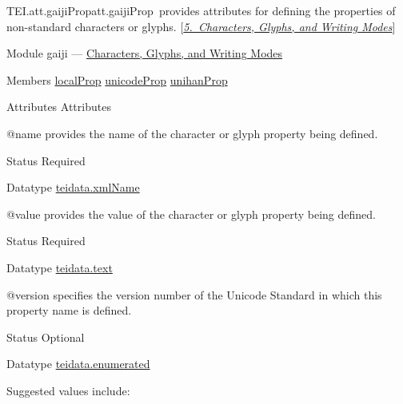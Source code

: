 \begin{reflist}
\item[]\begin{specHead}{TEI.att.gaijiProp}{att.gaijiProp} provides attributes for defining the properties of non-standard characters or glyphs.  [\textit{\hyperref[WD]{5.\ Characters, Glyphs, and Writing Modes}}]\end{specHead} 
    \item[{Module}]
  gaiji — \hyperref[WD]{Characters, Glyphs, and Writing Modes}
    \item[{Members}]
  \hyperref[TEI.localProp]{localProp} \hyperref[TEI.unicodeProp]{unicodeProp} \hyperref[TEI.unihanProp]{unihanProp}
    \item[{Attributes}]
  Attributes\hfil\\[-10pt]\begin{sansreflist}
    \item[@name]
  provides the name of the character or glyph property being defined.
\begin{reflist}
    \item[{Status}]
  Required
    \item[{Datatype}]
  \hyperref[TEI.teidata.xmlName]{teidata.xmlName}
\end{reflist}  
    \item[@value]
  provides the value of the character or glyph property being defined.
\begin{reflist}
    \item[{Status}]
  Required
    \item[{Datatype}]
  \hyperref[TEI.teidata.text]{teidata.text}
\end{reflist}  
    \item[@version]
  specifies the version number of the Unicode Standard in which this property name is defined.
\begin{reflist}
    \item[{Status}]
  Optional
    \item[{Datatype}]
  \hyperref[TEI.teidata.enumerated]{teidata.enumerated}
    \item[{Suggested values include:}]
  \begin{description}


\end{description}
\end{reflist}
\end{sansreflist}
\end{reflist}
